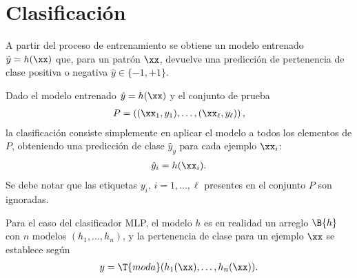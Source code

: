 %
%
%
\section{Clasificación}
%
A partir del proceso de entrenamiento se obtiene un modelo entrenado
$\hat{y} = h(\xx)$ que, para un patrón $\xx$, devuelve una predicción
de pertenencia de clase positiva o negativa $\hat{y}\in\{-1,+1\}$.

Dado el modelo entrenado $\hat{y} = h(\xx)$ y el conjunto de prueba
%
\begin{align*}
  P = \left( (\xx_1,y_1),\ldots,(\xx_\ell,y_\ell) \right),
\end{align*}
%
la clasificación consiste simplemente en aplicar el modelo a todos los
elementos de $P$, obteniendo una predicción de clase $\hat{y}_y$
para cada ejemplo $\xx_i$:
%
\begin{align*}
  \hat{y}_i = h(\xx_i).
\end{align*}
%
Se debe notar que las etiquetas $y_i,\,i=1,\ldots,\ell$ presentes en
el conjunto $P$ son ignoradas.

Para el caso del clasificador MLP, el modelo $h$ es en realidad un
arreglo $\B{h}$ con $n$ modelos $(h_1,\ldots,h_n)$, y la pertenencia
de clase para un ejemplo $\xx$ se establece según
%
\begin{align}
  y = \T{moda}( h_1(\xx), \ldots, h_n(\xx)).
\end{align}
%
